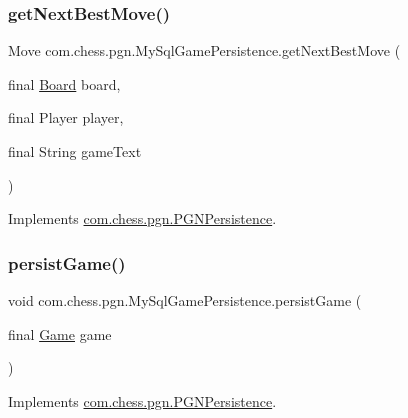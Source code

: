 \mbox{\label{classcom_1_1chess_1_1pgn_1_1_my_sql_game_persistence_a05fad44f338992121a0ec6c474fddf93}} 
\subsubsection{\texorpdfstring{getNextBestMove()}{getNextBestMove()}}
{\footnotesize\ttfamily Move com.\+chess.\+pgn.\+My\+Sql\+Game\+Persistence.\+get\+Next\+Best\+Move (\begin{DoxyParamCaption}\item[{final \mbox{\hyperlink{classcom_1_1chess_1_1engine_1_1classic_1_1board_1_1_board}{Board}}}]{board,  }\item[{final Player}]{player,  }\item[{final String}]{game\+Text }\end{DoxyParamCaption})}



Implements \mbox{\hyperlink{interfacecom_1_1chess_1_1pgn_1_1_p_g_n_persistence_a60257b57a23c0616ea28233c91221429}{com.\+chess.\+pgn.\+P\+G\+N\+Persistence}}.

\mbox{\label{classcom_1_1chess_1_1pgn_1_1_my_sql_game_persistence_a7faec01db9c72e7ef04b63a982013c21}} 
\subsubsection{\texorpdfstring{persistGame()}{persistGame()}}
{\footnotesize\ttfamily void com.\+chess.\+pgn.\+My\+Sql\+Game\+Persistence.\+persist\+Game (\begin{DoxyParamCaption}\item[{final \mbox{\hyperlink{classcom_1_1chess_1_1pgn_1_1_game}{Game}}}]{game }\end{DoxyParamCaption})}



Implements \mbox{\hyperlink{interfacecom_1_1chess_1_1pgn_1_1_p_g_n_persistence_a144870869633d521938c6de252a9d653}{com.\+chess.\+pgn.\+P\+G\+N\+Persistence}}.

